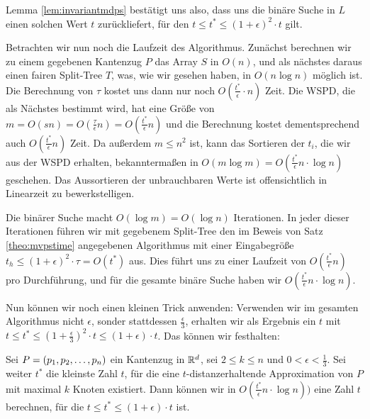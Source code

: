 Lemma \ref{lem:invariantmdps} bestätigt uns also, dass uns die binäre Suche in $L$ einen solchen Wert $t$ zurückliefert, für den $t \leq t^* \leq (1 + \epsilon)^2 \cdot t$ gilt.

Betrachten wir nun noch die Laufzeit des Algorithmus.
Zunächst berechnen wir zu einem gegebenen Kantenzug $P$ das Array $S$ in $O(n)$, und als nächstes daraus einen fairen Split-Tree $T$, was, wie wir gesehen haben, in $O(n \log n)$ möglich ist. 
Die Berechnung von $\tau$ kostet uns dann nur noch $O(\frac{t^*}{\epsilon} \cdot n)$ Zeit. 
Die WSPD, die als Nächstes bestimmt wird, hat eine Größe von $m = O(sn) = O(\frac{\tau}{\epsilon}n) = O(\frac{t^*}{\epsilon}n)$ und die Berechnung kostet dementsprechend auch $O(\frac{t^*}{\epsilon}n)$ Zeit. 
Da außerdem $m \leq n^2$ ist, kann das Sortieren der $t_i$, die wir aus der WSPD erhalten, bekanntermaßen in $O(m \log m) = O(\frac{t^*}{\epsilon}n \cdot \log n)$ geschehen. 
Das Aussortieren der unbrauchbaren Werte ist offensichtlich in Linearzeit zu bewerkstelligen. 

Die binärer Suche macht $O(\log m) = O(\log n)$ Iterationen. 
In jeder dieser Iterationen führen wir mit gegebenem Split-Tree den im Beweis von Satz \ref{theo:mvpstime} angegebenen Algorithmus mit einer Eingabegröße $t_h \leq (1 + \epsilon)^2 \cdot \tau = O(t^*)$ aus. 
Dies führt uns zu einer Laufzeit von $O(\frac{t^*}{\epsilon}n)$ pro Durchführung, und für die gesamte binäre Suche haben wir $O(\frac{t^*}{\epsilon}n \cdot \log n)$.

Nun können wir noch einen kleinen Trick anwenden: Verwenden wir im gesamten Algorithmus nicht $\epsilon$, sonder stattdessen $\frac{\epsilon}{3}$, erhalten wir als Ergebnis ein $t$ mit $t \leq t^* \leq (1 + \frac{\epsilon}{3})^2 \cdot t \leq (1 + \epsilon)\cdot t$. Das können wir festhalten:

\begin{theorem}
	Sei $P = (p_1, p_2, \mathellipsis, p_n)$ ein Kantenzug in $\mathbb{R}^d$, sei $2 \leq k \leq n$ und $0 < \epsilon < \frac{1}{3}$. 
	Sei weiter $t^*$ die kleinste Zahl $t$, für die eine $t$-distanzerhaltende Approximation von $P$ mit maximal $k$ Knoten existiert.
	Dann können wir in $O(\frac{t^*}{\epsilon}n \cdot \log n))$ eine Zahl $t$ berechnen, für die $t \leq t^* \leq (1 + \epsilon)\cdot t$ ist.
\end{theorem}
